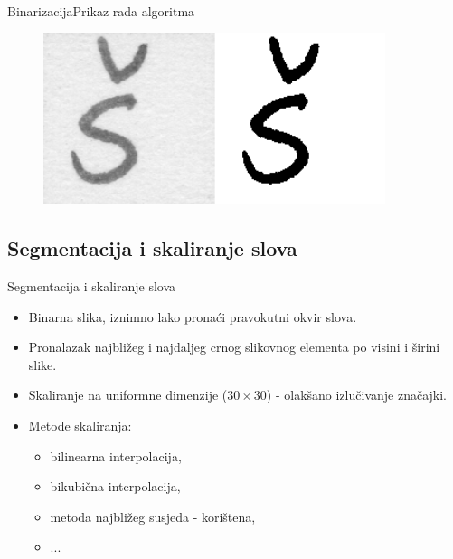 \documentclass{beamer}
\begin{document}
\begin{frame}{Binarizacija}{Prikaz rada algoritma}
  \begin{figure}[htb]
    \centering
    \includegraphics[width=10cm]{binarization_example.png}
\end{figure}
\end{frame}

\subsection{Segmentacija i skaliranje slova}

\begin{frame}{Segmentacija i skaliranje slova}
  \begin{itemize}
  \item {
    Binarna slika, iznimno lako pronaći pravokutni okvir slova.
    \pause
  }
  \item {
    Pronalazak najbližeg i najdaljeg crnog slikovnog elementa po visini i širini slike.
    \pause
  }
  \item {
    Skaliranje na uniformne dimenzije ($30 \times 30$) - olakšano izlučivanje značajki.
    \pause
  }
  \item{
    Metode skaliranja:
    \begin{itemize}
        \item bilinearna interpolacija,
        \item bikubična interpolacija,
        \item metoda najbližeg susjeda - korištena,
        \item ...
    \end{itemize}
  }
  \end{itemize}
\end{frame}
\end{document}
